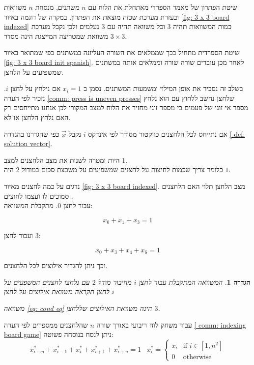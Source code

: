 \documentclass[12pt,leqno]{article}
\newtheorem{definition}{הגדרה}[section]
\begin{document}
שיטת הפתרון של מאמר הספרדי מאתחלת את הלוח עם  
$n$
משתנים,
מנסחת 
$n$
משוואות
ובעזרת מערכת שכזה מוצאת את הפתרון.
במקרה של דוגמה 
באיור 
\ref{fig: 3 x 3 board indexed}
כמות המשוואות תהיה
$3$
וכל משוואה תהיה עם 
$3$
נעלמים
ולכן נקבל מערכת משוואת שמטריצה המייצגת הינה מסדר 
$3 \times 3$.

שיטת הספרדית מתחיל בכך
שממלאים את השורה העליונה במשתנים
כפי שמתואר באיור 
\ref{fig: 3 x 3 board init spanish}.
לאחר מכן עוברים שורה שורה 
וממלאים אותה במשתנים שמשפיעים על הלחצן.

בשלב זה נסביר את אופן המילוי ומשמעות המשתנים.
נסמן ב
$x_i = 1$
אם נילחץ על לחצן 
$i$.
נזכיר לפי הערה 
\ref{comm: press is uneven presses}
שלחצן נחשב ללחוץ עם הוא נלחץ מספר אי זוגי של פעמים 
כי מספר זוגי מחזיר את הלוח למצב המקורי לכן
אנחנו מתייחסים רק האם נלחץ הלחצן או לא.

אם נתייחס לכל הלחצנים כווקטור מסודר לפי אינדקס
$i$
נקבל 
$\vec{x}$
כפי שהגדרנו בהגדרה 
\ref{ def: solution vector}.

היות ומטרה לשנות את מצב הלחצנים
למצב 
$1$.
\\
כלומר צריך שכמות לחיצות על לחצנים שמשפיעים על 
משבצת סכום במודול
$2$
היה 
$1$.

נדגים
על כמה לחצנים מאיור  
\ref{fig: 3 x 3 board indexed}.
מצב הלחצן תלוי האם הלחצנים 
סמוכים לו  ועצמו לחוצים .
\\
עבור 
לחצן 
$0$.
מתקבלת המשוואה:

\[ x_0 + x_1 + x_3 = 1\]

ועבור לחצן 
$3$:

\begin{equation}
    \label{eq: cond eq}
    x_0 + x_3 + x_4 + x_6 = 1
\end{equation}


וכך ניתן להגדיר אילוצים לכל הלחצנים.

\begin{definition}
    \label{ def: depndeciy equation}
    המשוואה המתקבלת
    עבור לחצן 
    $i$
    מחיבור מודל 
    $2$
    עם נלחצו לחצנים המשפעים על לחצן 
    תקראה
    משוואת אילוצים על לחצן 
    $i$
    
    משוואה 
    \ref{eq: cond eq}
    הינה משוואת האילוצים שללחצן
    $3$.
\end{definition}

עבור משחק לוח
ריבועי באורך שורה 
$n$
שהלחצנים ממספרים לפי הערה
\ref{ comm: indexing board game}
ניתן לנסח בנוסחה פשוטה:
\begin{equation}
    \label{eq: depndeciy equation}
    x^*_{i - n} + x^*_{i - 1} + x^*_{i} + x^*_{i + 1} + x^*_{i + n} = 1
    \hspace{10pt}
    x^*_i =
    \begin{cases}
        x_i & \text{if $i \in [1,n^2]$} \\
        0 & \text{otherwise}
    \end{cases}
\end{equation}
\end{document}
